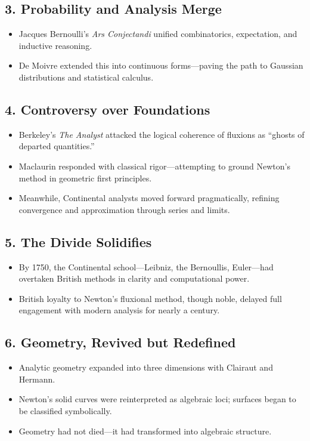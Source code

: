 \documentclass[9pt]{article}
\begin{document}
\subsection*{3. Probability and Analysis Merge}
\begin{itemize}
  \item Jacques Bernoulli’s \textit{Ars Conjectandi} unified combinatorics, expectation, and inductive reasoning.
  \item De Moivre extended this into continuous forms—paving the path to Gaussian distributions and statistical calculus.
\end{itemize}

\subsection*{4. Controversy over Foundations}
\begin{itemize}
  \item Berkeley’s \textit{The Analyst} attacked the logical coherence of fluxions as “ghosts of departed quantities.”
  \item Maclaurin responded with classical rigor—attempting to ground Newton’s method in geometric first principles.
  \item Meanwhile, Continental analysts moved forward pragmatically, refining convergence and approximation through series and limits.
\end{itemize}

\subsection*{5. The Divide Solidifies}
\begin{itemize}
  \item By 1750, the Continental school—Leibniz, the Bernoullis, Euler—had overtaken British methods in clarity and computational power.
  \item British loyalty to Newton’s fluxional method, though noble, delayed full engagement with modern analysis for nearly a century.
\end{itemize}

\subsection*{6. Geometry, Revived but Redefined}
\begin{itemize}
  \item Analytic geometry expanded into three dimensions with Clairaut and Hermann.
  \item Newton’s solid curves were reinterpreted as algebraic loci; surfaces began to be classified symbolically.
  \item Geometry had not died—it had transformed into algebraic structure.
\end{itemize}
\end{document}
